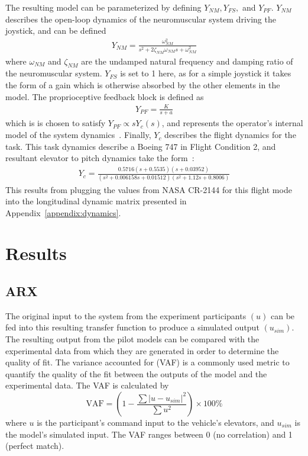 The resulting model can be parameterized by defining $Y_{NM}, Y_{FS},$ and $Y_{PF}$.
$Y_{NM}$ describes the open-loop dynamics of the neuromuscular system driving the joystick, and can be defined
\begin{align}
    Y_{NM} = \frac{\omega^2_{NM}}{s^2 + 2 \zeta_{NM} \omega_{NM} s + \omega^2_{NM}}
\end{align}
where $\omega_{NM}$ and $\zeta_{NM}$ are the undamped natural frequency and damping ratio of the neuromuscular system.
$Y_{FS}$ is set to 1 here, as for a simple joystick it takes the form of a gain which is otherwise absorbed by the other elements in the model.
The proprioceptive feedback block is defined as
\begin{align} \label{eq:ypf}
    Y_{PF} = \frac{K}{s+a}
\end{align}
which is is chosen to satisfy $Y_{PF} \propto s Y_c (s)$, and represents the operator's internal model of the system dynamics~\citep{hess_unified_1997}.
Finally, $Y_c$ describes the flight dynamics for the task.
This task dynamics describe a Boeing 747 in Flight Condition 2, and resultant elevator to pitch dynamics take the form~\citep{heffley1972aircraft}:
\begin{align}
    Y_c = \frac{0.5716 (s+0.5535) (s+0.03952)}{(s^2 + 0.006158s + 0.01512) (s^2 + 1.12s + 0.8006)}
\end{align}
This results from plugging the values from NASA CR-2144 for this flight mode into the longitudinal dynamic matrix presented in Appendix~\ref{appendix:dynamics}.

\section{Results}

\subsection{ARX}
The original input to the system from the experiment participants $(u)$ can be fed into this resulting transfer function to produce a simulated output $(u_{sim})$.
The resulting output from the pilot models can be compared with the experimental data from which they are generated in order to determine the quality of fit.
The variance accounted for (VAF) is a commonly used metric to quantify the quality of the fit between the outputs of the model and the experimental data.
The VAF is calculated by
\begin{equation}
    \mbox{VAF} = \left( 1 - \dfrac{\sum{|u - u_{sim}|^2}} {\sum{u^2}} \right) \times \mbox{100\%}
\end{equation}
where $u$ is the participant's command input to the vehicle's elevators, and $u_{sim}$ is the model's simulated input.
The VAF ranges between 0 (no correlation) and 1 (perfect match).

